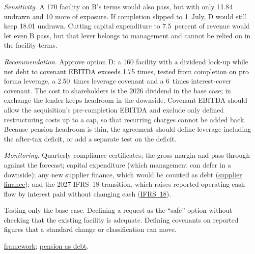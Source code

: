 \begin{qfexample}
\emph{Sensitivity.} A 170 facility on B's terms would also pass, but with only 11.84 undrawn and 10 more of exposure. If completion slipped to 1~July, D would still keep 18.01 undrawn. Cutting capital expenditure to 7.5~percent of revenue would let even B pass, but that lever belongs to management and cannot be relied on in the facility terms.

\emph{Recommendation.} Approve option D: a 160 facility with a dividend lock-up while net debt to covenant EBITDA exceeds 1.75 times, tested from completion on pro forma leverage, a 2.50~times leverage covenant and a 6~times interest-cover covenant. The cost to shareholders is the 2026 dividend in the base case; in exchange the lender keeps headroom in the downside. Covenant EBITDA should allow the acquisition's pre-completion EBITDA and exclude only defined restructuring costs up to a cap, so that recurring charges cannot be added back. Because pension headroom is thin, the agreement should define leverage including the after-tax deficit, or add a separate test on the deficit.

\emph{Monitoring.} Quarterly compliance certificates; the gross margin and pass-through against the forecast; capital expenditure (which management can defer in a downside); any new supplier finance, which would be counted as debt (\hyperref[meth:report-quality-evaluation]{supplier finance}); and the 2027 IFRS~18 transition, which raises reported operating cash flow by interest paid without changing cash (\hyperref[meth:accounting-change-effects]{IFRS~18}).

 Testing only the base case. Declining a request as the ``safe'' option without checking that the existing facility is adequate. Defining covenants on reported figures that a standard change or classification can move.

 \hyperref[def:statement-analysis-framework]{framework}; \hyperref[meth:post-employment-benefit-modelling]{pension as debt}.

\end{qfexample}

